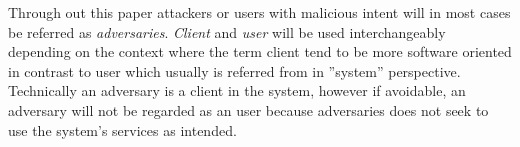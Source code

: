 Through out this paper attackers or users with malicious intent will in most cases be referred as \emph{adversaries}. \emph{Client} and \emph{user} will be used interchangeably depending on the context where the term client tend to be more software oriented in contrast to user which usually is referred from in ''system'' perspective. Technically an adversary is a client in the system, however if avoidable, an adversary will not be regarded as an user because adversaries does not seek to use the system's services as intended. 